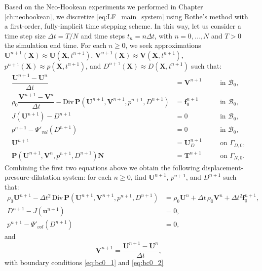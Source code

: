 \documentclass{sfuthesis}
\numberwithin{equation}{section}
\numberwithin{figure}{chapter}
\numberwithin{table}{chapter}
\theoremstyle{definition}
\def\*#1{{\mathbf{#1}}} %
\newcommand{\Divt}[1]{{\bm{\mathrm{Div}} \, #1}}
\newcommand{\B}{\mathcal{B}}
\begin{document}
Based on the Neo-Hookean experiments we performed in Chapter \ref{ch:neohookean}, we discretize \eqref{eq:LF_main_system} using Rothe's method with a first-order, fully-implicit time stepping scheme. In this way, let us consider a time step size $\Delta t = T/N$ and time steps $t_n = n \Delta t$, with $n=0,\dots,N$ and $T > 0$ the simulation end time. For each $n \geq 0$, we seek approximations $\*U^{n+1}(\*X) \approx \*U(\*X,t^{n+1})$, $\*V^{n+1}(\*X) \approx \*V(\*X,t^{n+1})$, $p^{n+1}(\*X) \approx p(\*X,t^{n+1})$, and $D^{n+1}(\*X) \approx D(\*X,t^{n+1})$ such that:
\begin{subequations}
    \begin{align}
    \dfrac{\*U^{n+1} - \*U^n}{\Delta t} &= \*V^{n+1} \quad &&\text{in } \B_0, \\
    \rho_0 \dfrac{\*V^{n+1} - \*V^n}{\Delta t} - \Divt{\*P(\*U^{n+1}, \*V^{n+1}, p^{n+1}, D^{n+1})} &= \*f_0^{n+1} \quad &&\text{in } \B_0, \\
    J(\*U^{n+1}) - D^{n+1} &= 0 \quad &&\text{in } \B_0, \\
    p^{n+1}-\Psi'_{vol}(D^{n+1}) &= 0 \quad &&\text {in } \B_0, \\
    \label{eq:bc0_1} \*U^{n+1} &= \*U_D^{n+1} \quad &&\text{on } \Gamma_{D,0}, \\
    \label{eq:bc0_2} \*P(\*U^{n+1},\*V^n,p^{n+1},D^{n+1}) \*N &= \*T^{n+1} \quad &&\text{on }\Gamma_{N,0}.
    \end{align}
\end{subequations}
Combining the first two equations above we obtain the following displacement-pressure-dilatation system: for each $n \geq 0$, find $\*U^{n+1}$, $p^{n+1}$, and $D^{n+1}$ such that:
\begin{subequations}\label{eq:LF_time}
    \begin{align}
    \label{eq:LF_time_1}\rho_0 \*U^{n+1} - \Delta t^2 \, \Divt{\*P(\*U^{n+1}, \*V^{n+1}, p^{n+1}, D^{n+1})} &= \rho_0 \*U^n + \Delta t \, \rho_0 \*V^n + \Delta t^2 \*f_0^{n+1}, \\
    \label{eq:LF_time_2}D^{n+1}-J(\*u^{n+1}) &= 0 , \\
    \label{eq:LF_time_3}p^{n+1}-\Psi'_{vol}(D^{n+1}) &= 0,
    \end{align}
\end{subequations}
and
\begin{equation}
    \*V^{n+1} = \dfrac{\*U^{n+1} - \*U^n}{\Delta t},
\end{equation}
with boundary conditions \eqref{eq:bc0_1} and \eqref{eq:bc0_2} 
\end{document}
